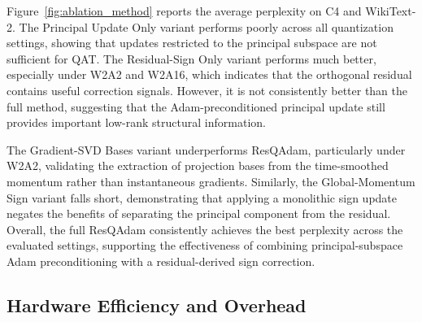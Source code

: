 \documentclass{article} %
\begin{document}
Figure~\ref{fig:ablation_method} reports the average perplexity on C4 and WikiText-2. 
The Principal Update Only variant performs poorly across all quantization settings, showing that updates restricted to the principal subspace are not sufficient for QAT. 
The Residual-Sign Only variant performs much better, especially under W2A2 and W2A16, which indicates that the orthogonal residual contains useful correction signals. 
However, it is not consistently better than the full method, suggesting that the Adam-preconditioned principal update still provides important low-rank structural information.

The Gradient-SVD Bases variant underperforms ResQAdam, particularly under W2A2, validating the extraction of projection bases from the time-smoothed momentum rather than instantaneous gradients. 
Similarly, the Global-Momentum Sign variant falls short, demonstrating that applying a monolithic sign update negates the benefits of separating the principal component from the residual. 
Overall, the full ResQAdam consistently achieves the best perplexity across the evaluated settings, supporting the effectiveness of combining principal-subspace Adam preconditioning with a residual-derived sign correction.

\subsection{Hardware Efficiency and Overhead}
\label{sec:speed}

\begin{table}[t]
\scriptsize
\centering
\caption{Comparison of optimizer-state memory, total peak memory, and training throughput across different models. Values in each cell are formatted as \textit{AdamW / ResQAdam}, with relative changes in parentheses.}
\vspace{-0.1in}
\label{tab:speed}
\end{table}
\end{document}

